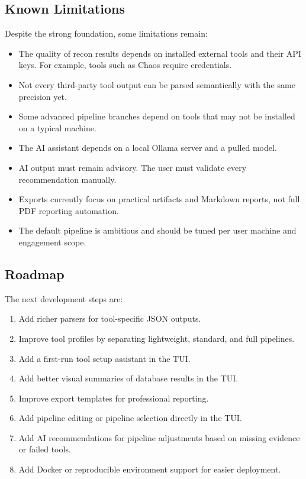 \documentclass[a4paper,12pt]{article}
\begin{document}
\subsection{Known Limitations}

Despite the strong foundation, some limitations remain:

\begin{itemize}
    \item The quality of recon results depends on installed external tools and their API keys. For example, tools such as Chaos require credentials.
    \item Not every third-party tool output can be parsed semantically with the same precision yet.
    \item Some advanced pipeline branches depend on tools that may not be installed on a typical machine.
    \item The AI assistant depends on a local Ollama server and a pulled model.
    \item AI output must remain advisory. The user must validate every recommendation manually.
    \item Exports currently focus on practical artifacts and Markdown reports, not full PDF reporting automation.
    \item The default pipeline is ambitious and should be tuned per user machine and engagement scope.
\end{itemize}

\subsection{Roadmap}

The next development steps are:

\begin{enumerate}
    \item Add richer parsers for tool-specific JSON outputs.
    \item Improve tool profiles by separating lightweight, standard, and full pipelines.
    \item Add a first-run tool setup assistant in the TUI.
    \item Add better visual summaries of database results in the TUI.
    \item Improve export templates for professional reporting.
    \item Add pipeline editing or pipeline selection directly in the TUI.
    \item Add AI recommendations for pipeline adjustments based on missing evidence or failed tools.
    \item Add Docker or reproducible environment support for easier deployment.
\end{enumerate}
\end{document}
